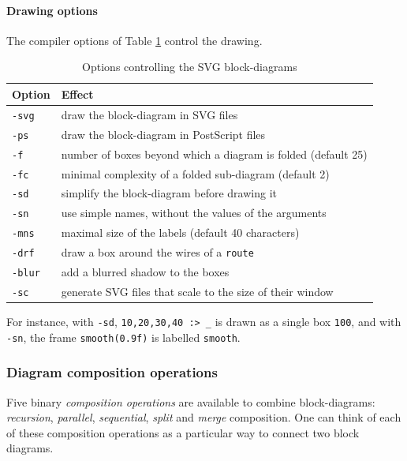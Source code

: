 \paragraph{Drawing options}

The compiler options of Table \ref{table-svgoptions} control the drawing.

\begin{table}[ht]
	\centering
	\begin{tabular}{|l|l|}
		\hline
		\textbf{Option} & \textbf{Effect} \\
		\hline
		\texttt{-svg} & draw the block-diagram in SVG files \\
		\texttt{-ps} & draw the block-diagram in PostScript files \\
		\texttt{-f \farg{n}} & number of boxes beyond which a diagram is folded (default 25) \\
		\texttt{-fc \farg{n}} & minimal complexity of a folded sub-diagram (default 2) \\
		\texttt{-sd} & simplify the block-diagram before drawing it \\
		\texttt{-sn} & use simple names, without the values of the arguments \\
		\texttt{-mns \farg{n}} & maximal size of the labels (default 40 characters) \\
		\texttt{-drf} & draw a box around the wires of a \texttt{route} \\
		\texttt{-blur} & add a blurred shadow to the boxes \\
		\texttt{-sc} & generate SVG files that scale to the size of their window \\
		\hline
	\end{tabular}
\caption{Options controlling the SVG block-diagrams}
	\label{table-svgoptions}
\end{table}

For instance, with \lstinline'-sd', \lstinline'10,20,30,40 :> _' is drawn as a single box \lstinline'100', and with \lstinline'-sn', the frame \lstinline'smooth(0.9f)' is labelled \lstinline'smooth'.

\subsubsection{Diagram composition operations}
Five binary \emph{composition operations} are available to combine block-diagrams: \textit{recursion}, \textit{parallel}, \textit{sequential}, \textit{split} and \textit{merge} composition. One can think of each of these composition operations as a particular way to connect two block diagrams. 


